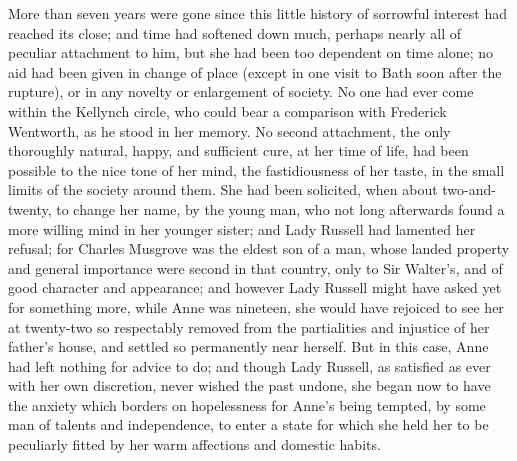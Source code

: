 More than seven years were gone since this little history of sorrowful interest had reached its close; and time had softened down much, perhaps nearly all of peculiar attachment to him, but she had been too dependent on time alone; no aid had been given in change of place (except in one visit to Bath soon after the rupture), or in any novelty or enlargement of society. No one had ever come within the Kellynch circle, who could bear a comparison with Frederick Wentworth, as he stood in her memory. No second attachment, the only thoroughly natural, happy, and sufficient cure, at her time of life, had been possible to the nice tone of her mind, the fastidiousness of her taste, in the small limits of the society around them. She had been solicited, when about two-and-twenty, to change her name, by the young man, who not long afterwards found a more willing mind in her younger sister; and Lady Russell had lamented her refusal; for Charles Musgrove was the eldest son of a man, whose landed property and general importance were second in that country, only to Sir Walter's, and of good character and appearance; and however Lady Russell might have asked yet for something more, while Anne was nineteen, she would have rejoiced to see her at twenty-two so respectably removed from the partialities and injustice of her father's house, and settled so permanently near herself. But in this case, Anne had left nothing for advice to do; and though Lady Russell, as satisfied as ever with her own discretion, never wished the past undone, she began now to have the anxiety which borders on hopelessness for Anne's being tempted, by some man of talents and independence, to enter a state for which she held her to be peculiarly fitted by her warm affections and domestic habits.

